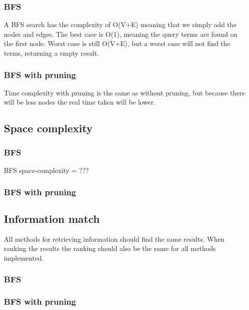 \subsubsection{BFS}
A BFS search has the complexity of O(V+E) \cite{Something} meaning that we simply add the nodes and edges. The best case is O(1), meaning the query terms are found on the first node. Worst case is still O(V+E), but a worst case will not find the terms, returning a empty result.

\subsubsection{BFS with pruning}
Time complexity with pruning is the same as without pruning, but because there will be less nodes the real time taken will be lower.

\subsection{Space complexity}
\subsubsection{BFS}
BFS space-complexity = ??? \cite{something}

\subsubsection{BFS with pruning}

\subsection{Information match}
All methods for retrieving information should find the same results. When ranking the results the ranking should also be the same for all methods implemented.

\subsubsection{BFS}

\subsubsection{BFS with pruning}


\clearpage